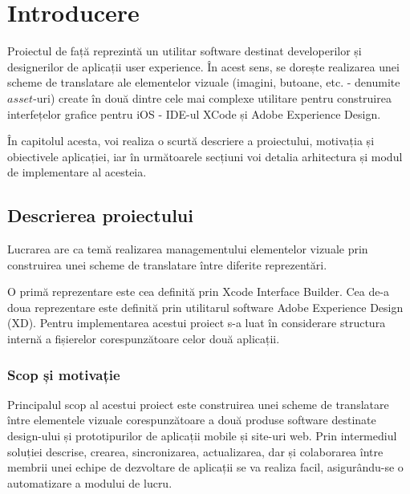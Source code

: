 \renewcommand{\chaptername}{Capitolul}
\renewcommand{\bibname}{Bibliografie}

\chapter{Introducere}
\label{chapter:intro}

\par Proiectul de față reprezintă un utilitar software destinat developerilor și designerilor de aplicații user experience. În acest sens, se dorește realizarea unei scheme de translatare ale elementelor vizuale (imagini, butoane, etc. - denumite $asset$-uri) create în două dintre cele mai complexe utilitare pentru construirea interfețelor grafice pentru iOS -  IDE-ul XCode și  Adobe Experience Design.
\par În capitolul acesta, voi realiza o scurtă descriere a proiectului, motivația și obiectivele aplicației, iar în următoarele secțiuni voi detalia arhitectura și modul de implementare al acesteia.

\section{Descrierea proiectului}
\label{sec:proj}
\par Lucrarea are ca temă realizarea managementului elementelor vizuale prin construirea unei scheme de translatare între diferite reprezentări.  
\par O primă reprezentare este cea definită prin Xcode Interface Builder. Cea de-a doua reprezentare este definită prin utilitarul software Adobe Experience Design (XD). 
Pentru implementarea acestui proiect s-a luat în considerare structura internă a fișierelor corespunzătoare celor două aplicații.



\subsection{Scop și motivație}
\label{sub-sec:proj-scope}
Principalul scop al acestui proiect este construirea unei scheme de translatare între elementele vizuale corespunzătoare a două produse software destinate design-ului și prototipurilor de aplicații mobile și site-uri web. Prin intermediul soluției descrise, crearea, sincronizarea, actualizarea, dar și colaborarea între membrii unei echipe de dezvoltare de aplicații se va realiza facil, asigurându-se o automatizare a modului de lucru.

